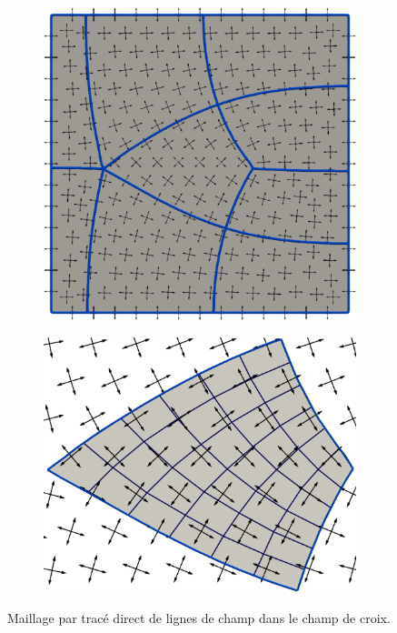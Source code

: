 \begin{figure}[h!]
\centering
\begin{subfigure}{0.49\textwidth}
    \includegraphics[width=\textwidth]{images/mesh_by_streamline_1.pdf}
    \label{fig:mesh_by_streamline_1}
\end{subfigure}
\hfill
\begin{subfigure}{0.49\textwidth}
    \includegraphics[width=\textwidth]{images/mesh_by_streamline_2.pdf}
    \label{fig:mesh_by_streamline_2}
\end{subfigure}
\caption{Maillage par tracé direct de lignes de champ dans le champ de croix.}
\label{fig:mesh_by_streamline}
\end{figure}


